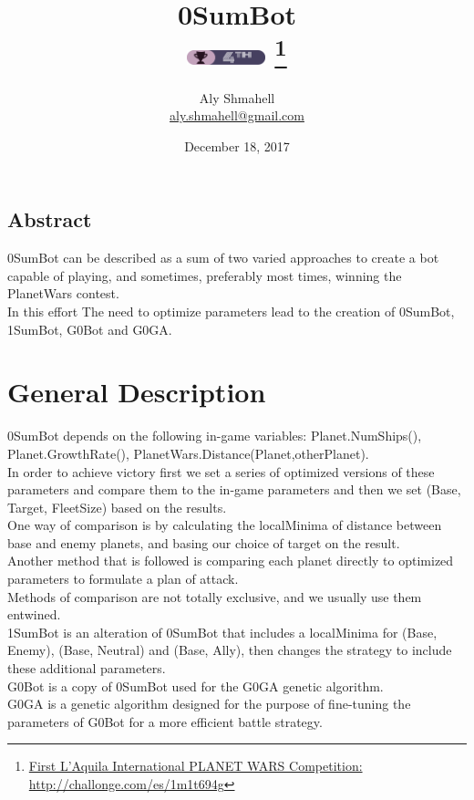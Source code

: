 \documentclass[12pt]{scrartcl}
\begin{document}
	\title{%
		0SumBot\\[1ex]
		\includegraphics[width=64pt,height=12pt]{graphics/badge.png} 
		\footnote{\href{http://challonge.com/es/1m1t694g}{First L'Aquila International PLANET WARS Competition: http://challonge.com/es/1m1t694g}}
	}
	\author{Aly Shmahell\\%
		\href{aly.shmahell@gmail.com}{aly.shmahell@gmail.com}
	}
	\date{December 18, 2017}
	
	\maketitle	
	\newpage
	\begin{center}
		\section*{\hfil \hfil  Abstract \hfil }
	\end{center}
		0SumBot can be described as a sum of two varied approaches to create a bot capable of playing, and sometimes, preferably most times, winning the PlanetWars contest.\\
		In this effort The need to optimize parameters lead to the creation of 0SumBot, 1SumBot, G0Bot and G0GA.
		
    \newpage
	\section*{\textbf{General Description}}
		0SumBot depends on the following in-game variables: Planet.NumShips(), Planet.GrowthRate(), PlanetWars.Distance(Planet,otherPlanet).\\
		In order to achieve victory first we set a series of optimized versions of these parameters and compare them to the in-game parameters and then we set (Base, Target, FleetSize) based on the results.\\
		One way of comparison is by calculating the localMinima of distance between base and enemy planets, and basing our choice of target on the result.\\
		Another method that is followed is comparing each planet directly to optimized parameters to formulate a plan of attack.\\
		Methods of comparison are not totally exclusive, and we usually use them entwined.\\
		1SumBot is an alteration of 0SumBot that includes a localMinima for (Base, Enemy), (Base, Neutral) and (Base, Ally), then changes the strategy to include these additional parameters.\\
		G0Bot is a copy of 0SumBot used for the G0GA genetic algorithm.\\
		G0GA is a genetic algorithm designed for the purpose of fine-tuning the parameters of G0Bot for a more efficient battle strategy.
\end{document}
